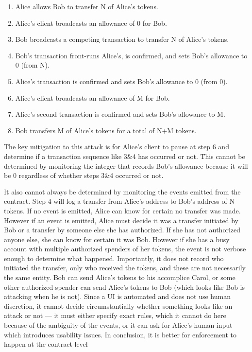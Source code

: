 \begin{enumerate}
	\item Alice allows Bob to transfer N of Alice's tokens.
	\item Alice's client broadcasts an allowance of 0 for Bob.
	\item Bob broadcasts a competing transaction to transfer N of Alice’s tokens.
	\item Bob's transaction front-runs Alice's, is confirmed, and sets Bob’s allowance to 0 (from N).
	\item Alice’s transaction is confirmed and sets Bob’s allowance to 0 (from 0).
	\item Alice's client broadcasts an allowance of M for Bob.
	\item Alice’s second transaction is confirmed and sets Bob's allowance to M.
	\item Bob transfers M of Alice’s tokens for a total of N+M tokens.
\end{enumerate}

The key mitigation to this attack is for Alice's client to pause at step 6 and determine if a transaction sequence like 3\&4 has occurred or not. This cannot be determined by monitoring the integer that records Bob's allowance because it will be 0 regardless of whether steps 3\&4 occurred or not. 

It also cannot always be determined by monitoring the events emitted from the contract. Step 4 will log a transfer from Alice's address to Bob's address of N tokens. If no event is emitted, Alice can know for certain no transfer was made. However if an event is emitted, Alice must decide it was a transfer initiated by Bob or a transfer by someone else she has authorized. If she has not authorized anyone else, she can know for certain it was Bob. However if she has a busy account with multiple authorized spenders of her tokens, the event is not verbose enough to determine what happened. Importantly, it does not record who initiated the transfer, only who received the tokens, and these are not necessarily the same entity. Bob can send Alice's tokens to his accomplice Carol, or some other authorized spender can send Alice's tokens to Bob (which looks like Bob is attacking when he is not). Since a UI is automated and does not use human discretion, it cannot decide circumstantially whether something looks like an attack or not --- it must either specify exact rules, which it cannot do here because of the ambiguity of the events, or it can ask for Alice's human input which introduces usability issues. In conclusion, it is better for enforcement to happen at the contract level



